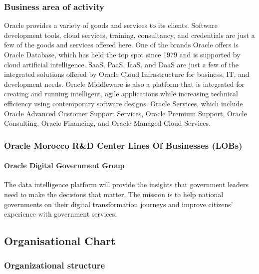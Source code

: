 \subsubsection*{Business area of activity}

Oracle provides a variety of goods and services to its clients. Software development tools, cloud services, training, consultancy, and credentials are just a few of the goods and services offered here. One of the brands Oracle offers is Oracle Database, which has held the top spot since 1979 and is supported by cloud artificial intelligence. SaaS, PaaS, IaaS, and DaaS are just a few of the integrated solutions offered by Oracle Cloud Infrastructure for business, IT, and development needs. Oracle Middleware is also a platform that is integrated for creating and running intelligent, agile applications while increasing technical efficiency using contemporary software designs. Oracle Services, which include Oracle Advanced Customer Support Services, Oracle Premium Support, Oracle Consulting, Oracle Financing, and Oracle Managed Cloud Services.

\subsubsection*{Oracle Morocco R\&D Center Lines Of Businesses (LOBs)}

\paragraph{Oracle Digital Government Group}

The data intelligence platform will provide the insights that government leaders need to make the decisions that matter. The mission is to help national governments on their digital transformation journeys and improve citizens’ experience with government services.

\subsection{Organisational Chart}
\label{subsec:org_chart}

\subsubsection*{Organizational structure}

